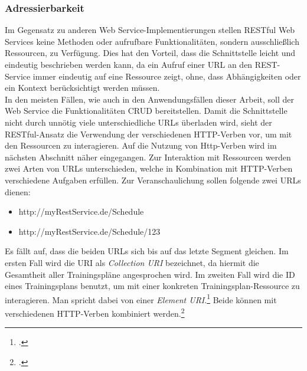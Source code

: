 \subsubsection*{Adressierbarkeit}
Im Gegensatz zu anderen Web Service-Implementierungen stellen \ac{REST}ful Web Services keine Methoden oder aufrufbare Funktionalitäten, sondern ausschließlich Ressourcen, zu Verfügung. Dies hat den Vorteil, dass die Schnittstelle leicht und eindeutig beschrieben werden kann, da ein Aufruf einer \ac{URL} an den \ac{REST}-Service immer eindeutig auf eine Ressource zeigt, ohne, dass Abhängigkeiten oder ein Kontext berücksichtigt werden müssen. \\
In den meisten Fällen, wie auch in den Anwendungsfällen dieser Arbeit, soll der Web Service die Funktionalitäten \ac{CRUD} bereitstellen. Damit die Schnittstelle nicht durch unnötig viele unterschiedliche \ac{URL}s überladen wird, sieht der \ac{REST}ful-Ansatz die Verwendung der verschiedenen \ac{HTTP}-Verben vor, um mit den Ressourcen zu interagieren. Auf die Nutzung von Http-Verben wird im nächsten Abschnitt näher eingegangen. Zur Interaktion mit Ressourcen werden zwei Arten von \ac{URL}s unterschieden, welche in Kombination mit \ac{HTTP}-Verben verschiedene Aufgaben erfüllen. Zur Veranschaulichung sollen folgende zwei \ac{URL}s dienen:
\begin{itemize}
\item http://myRestService.de/Schedule
\item http://myRestService.de/Schedule/123
\end{itemize}
Es fällt auf, dass die beiden \ac{URL}s sich bis auf das letzte Segment gleichen. Im ersten Fall wird die \ac{URI} als \textit{Collection \ac{URI}} bezeichnet, da hiermit die Gesamtheit aller Trainingspläne angesprochen wird. Im zweiten Fall wird die ID eines Trainingsplans benutzt, um mit einer konkreten Trainingsplan-Ressource zu interagieren. Man spricht dabei von einer \textit{Element \ac{URI}}.\footcite[S. 12ff.]{Building-a-REST-Service} Beide können mit verschiedenen \ac{HTTP}-Verben kombiniert werden.\footcite[S. 26ff.]{REST-und-HTTP}

